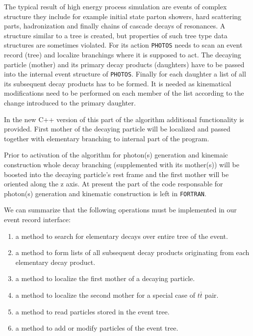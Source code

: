 \documentclass[]{Photos_interface_design}
\begin{document}
The typical result of high energy process simulation are events of complex structure
they include for example initial state parton showers, hard scattering parts,
hadronization and finally chains of cascade decays of resonances. 
A structure similar to a tree is created, but properties of such tree type data structures
are sometimes violated.
For its action {\tt PHOTOS} needs to scan an event record (tree) 
and localize branchings where
it is supposed to act. The decaying particle (mother) and its primary decay products
(daughters) have to be passed into the internal event structure of {\tt PHOTOS}. 
Finally for each daughter a list of all its subsequent decay products has to be 
formed. It is needed as kinematical modifications need to be performed on each 
member of the list according to the change introduced to the primary daughter.

In the new C++ version of this part of the algorithm additional functionality
is provided.
First mother of the decaying particle will be localized and passed together with  
elementary branching to internal part of the program. 

Prior to activation of the algorithm for  photon(s) generation and kinemaic construction
whole decay branching 
(supplemented with its mother(s))
will be boosted into the decaying particle's rest frame and the first mother
will be oriented along the z axis. At present the part of the code responsable for photon(s) generation and kinematic 
construction is left in  {\tt FORTRAN}.

We can summarize that the following operations must be implemented
in our event record interface:
\begin{enumerate}
\item a method to search for elementary decays over entire tree of the event.
\item a method to form lists of all subsequent decay products originating from each elementary decay product.
\item a method to localize the first mother of a decaying particle. 
\item a method to localize the second mother for a special case of $t \bar t$ pair.
\item a method to read  particles stored in the event tree.
\item a method to add or modify particles of the event tree.
\end{enumerate}
\end{document}
